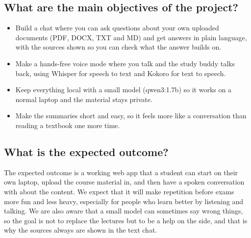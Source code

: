 \documentclass[11pt,a4paper]{article}
\begin{document}
\subsection*{What are the main objectives of the project?}

\begin{itemize}[leftmargin=*]
  \item Build a chat where you can ask questions about your own uploaded
        documents (PDF, DOCX, TXT and MD) and get answers in plain language,
        with the sources shown so you can check what the answer builds on.
  \item Make a hands-free voice mode where you talk and the study buddy talks
        back, using Whisper for speech to text and Kokoro for text to speech.
  \item Keep everything local with a small model (qwen3:1.7b) so it works
        on a normal laptop and the material stays private.
  \item Make the summaries short and easy, so it feels more like a
        conversation than reading a textbook one more time.
\end{itemize}

\subsection*{What is the expected outcome?}

The expected outcome is a working web app that a student can start on their own
laptop, upload the course material in, and then have a spoken conversation with
about the content. We expect that it will make repetition before exams more fun
and less heavy, especially for people who learn better by listening and
talking. We are also aware that a small model can sometimes say wrong things,
so the goal is not to replace the lectures but to be a help on the side, and
that is why the sources always are shown in the text chat.
\end{document}
